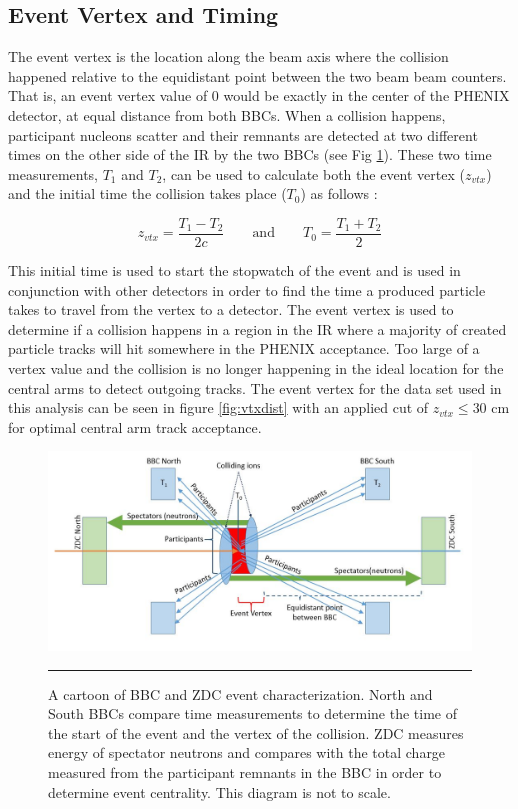 \subsection{Event Vertex and Timing}
\label{sect:timeandvtx}
The event vertex is the location along the beam axis where the collision happened relative to the equidistant point between the two beam beam counters. That is, an event vertex value of 0 would be exactly in the center of the PHENIX detector, at equal distance from both BBCs. When a collision happens, participant nucleons scatter and their remnants are detected at two different times on the other side of the IR by the two BBCs (see Fig \ref{fig:zdcvtx}). These two time measurements, $T_1$ and $T_2$, can be used to calculate both the event vertex ($z_{vtx}$) and the initial time the collision takes place ($T_0$) as follows \citep{Mitchell:2002wu}:

\begin{equation}
 z_{vtx} = \frac{T_1 - T_2}{2c} \qquad\text{and}\qquad T_0 = \frac{T_1 + T_2}{2}
\end{equation}

This initial time is used to start the stopwatch of the event and is used in conjunction with other detectors in order to find the time a produced particle takes to travel from the vertex to a detector. The event vertex is used to determine if a collision happens in a region in the IR where a majority of created particle tracks will hit somewhere in the PHENIX acceptance. Too large of a vertex value and the collision is no longer happening in the ideal location for the central arms to detect outgoing tracks. The event vertex for the data set used in this analysis can be seen in figure \ref{fig:vtxdist} with an applied cut of $z_{vtx} \leq 30$ cm for optimal central arm track acceptance.

\begin{figure}[htbp!]
  \centering
    \includegraphics[width=1\textwidth]{Figures/BBCevtchar.JPG}
    \rule{35em}{0.5pt}
  \caption[Diagram of BBC and ZDC event characterization]{A cartoon of BBC and ZDC event characterization. North and South BBCs compare time measurements to determine the time of the start of the event and the vertex of the collision. ZDC measures energy of spectator neutrons and compares with the total charge measured from the participant remnants in the BBC in order to determine event centrality. This diagram is not to scale.}
  \label{fig:zdcvtx}
\end{figure}


